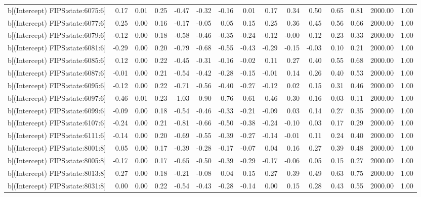 \begin{table}[ht]
\begin{tabular}{rrrrrrrrrrrrrrr}
  b[(Intercept) FIPS:state:6075:6] & 0.17 & 0.01 & 0.25 & -0.47 & -0.32 & -0.16 & 0.01 & 0.17 & 0.34 & 0.50 & 0.65 & 0.81 & 2000.00 & 1.00 \\ 
  b[(Intercept) FIPS:state:6077:6] & 0.25 & 0.00 & 0.16 & -0.17 & -0.05 & 0.05 & 0.15 & 0.25 & 0.36 & 0.45 & 0.56 & 0.66 & 2000.00 & 1.00 \\ 
  b[(Intercept) FIPS:state:6079:6] & -0.12 & 0.00 & 0.18 & -0.58 & -0.46 & -0.35 & -0.24 & -0.12 & -0.00 & 0.12 & 0.23 & 0.33 & 2000.00 & 1.00 \\ 
  b[(Intercept) FIPS:state:6081:6] & -0.29 & 0.00 & 0.20 & -0.79 & -0.68 & -0.55 & -0.43 & -0.29 & -0.15 & -0.03 & 0.10 & 0.21 & 2000.00 & 1.00 \\ 
  b[(Intercept) FIPS:state:6085:6] & 0.12 & 0.00 & 0.22 & -0.45 & -0.31 & -0.16 & -0.02 & 0.11 & 0.27 & 0.40 & 0.55 & 0.68 & 2000.00 & 1.00 \\ 
  b[(Intercept) FIPS:state:6087:6] & -0.01 & 0.00 & 0.21 & -0.54 & -0.42 & -0.28 & -0.15 & -0.01 & 0.14 & 0.26 & 0.40 & 0.53 & 2000.00 & 1.00 \\ 
  b[(Intercept) FIPS:state:6095:6] & -0.12 & 0.00 & 0.22 & -0.71 & -0.56 & -0.40 & -0.27 & -0.12 & 0.02 & 0.15 & 0.31 & 0.46 & 2000.00 & 1.00 \\ 
  b[(Intercept) FIPS:state:6097:6] & -0.46 & 0.01 & 0.23 & -1.03 & -0.90 & -0.76 & -0.61 & -0.46 & -0.30 & -0.16 & -0.03 & 0.11 & 2000.00 & 1.00 \\ 
  b[(Intercept) FIPS:state:6099:6] & -0.09 & 0.00 & 0.18 & -0.54 & -0.46 & -0.33 & -0.21 & -0.09 & 0.03 & 0.14 & 0.27 & 0.35 & 2000.00 & 1.00 \\ 
  b[(Intercept) FIPS:state:6107:6] & -0.24 & 0.00 & 0.21 & -0.81 & -0.66 & -0.50 & -0.38 & -0.24 & -0.10 & 0.03 & 0.17 & 0.29 & 2000.00 & 1.00 \\ 
  b[(Intercept) FIPS:state:6111:6] & -0.14 & 0.00 & 0.20 & -0.69 & -0.55 & -0.39 & -0.27 & -0.14 & -0.01 & 0.11 & 0.24 & 0.40 & 2000.00 & 1.00 \\ 
  b[(Intercept) FIPS:state:8001:8] & 0.05 & 0.00 & 0.17 & -0.39 & -0.28 & -0.17 & -0.07 & 0.04 & 0.16 & 0.27 & 0.39 & 0.48 & 2000.00 & 1.00 \\ 
  b[(Intercept) FIPS:state:8005:8] & -0.17 & 0.00 & 0.17 & -0.65 & -0.50 & -0.39 & -0.29 & -0.17 & -0.06 & 0.05 & 0.15 & 0.27 & 2000.00 & 1.00 \\ 
  b[(Intercept) FIPS:state:8013:8] & 0.27 & 0.00 & 0.18 & -0.21 & -0.08 & 0.04 & 0.15 & 0.27 & 0.39 & 0.49 & 0.63 & 0.75 & 2000.00 & 1.00 \\ 
  b[(Intercept) FIPS:state:8031:8] & 0.00 & 0.00 & 0.22 & -0.54 & -0.43 & -0.28 & -0.14 & 0.00 & 0.15 & 0.28 & 0.43 & 0.55 & 2000.00 & 1.00 \\ 

\end{tabular}
\end{table}

